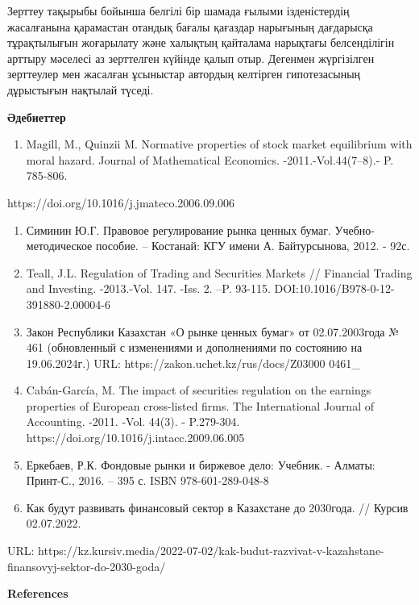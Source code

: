 Зерттеу тақырыбы бойынша белгілі бір шамада ғылыми ізденістердің
жасалғанына қарамастан отандық бағалы қағаздар нарығының дағдарысқа
тұрақтылығын жоғарылату және халықтың қайталама нарықтағы белсенділігін
арттыру мәселесі аз зерттелген күйінде қалып отыр. Дегенмен жүргізілген
зерттеулер мен жасалған ұсыныстар автордың келтірген гипотезасының
дұрыстығын нақтылай түседі.

{\bfseries Әдебиеттер}

\begin{enumerate}
\def\labelenumi{\arabic{enumi}.}
\item
  Magill, M., Quinzii M. Normative properties of stock market
  equilibrium with moral hazard. Journal of Mathematical Economics.
  -2011.-Vol.44(7--8).- P. 785-806.
\end{enumerate}

https://doi.org/10.1016/j.jmateco.2006.09.006

\begin{enumerate}
\def\labelenumi{\arabic{enumi}.}
\setcounter{enumi}{1}
\item
  Симинин Ю.Г. Правовое регулирование рынка ценных бумаг.
  Учебно-методическое пособие. -- Костанай: КГУ имени А. Байтурсынова,
  2012. - 92с.
\item
  Teall, J.L. Regulation of Trading and Securities Markets // Financial
  Trading and Investing. -2013.-Vol. 147. -Iss. 2. --P. 93-115.
  DOI:10.1016/B978-0-12-391880-2.00004-6
\item
  Закон Республики Казахстан «О рынке ценных бумаг» от 02.07.2003года №
  461 (обновленный с изменениями и дополнениями по состоянию на
  19.06.2024г.) URL: https://zakon.uchet.kz/rus/docs/Z03000 0461\_
\item
  Cabán-García, M. The impact of securities regulation on the earnings
  properties of European cross-listed firms. The International Journal
  of Accounting. -2011. -Vol. 44(3). - P.279-304.
  https://doi.org/10.1016/j.intacc.2009.06.005
\item
  Еркебаев, Р.К. Фондовые рынки и биржевое дело: Учебник. - Алматы:
  Принт-С., 2016. -- 395 с. ISBN 978-601-289-048-8
\item
  Как будут развивать финансовый сектор в Казахстане до 2030года. //
  Курсив 02.07.2022.
\end{enumerate}

URL:
https://kz.kursiv.media/2022-07-02/kak-budut-razvivat-v-kazahstane-finansovyj-sektor-do-2030-goda/

{\bfseries References}

